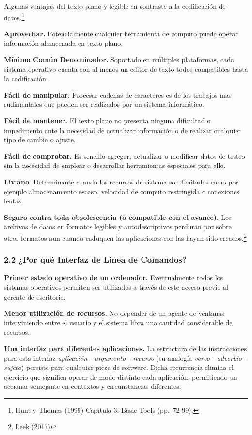\documentclass[]{article}
\begin{document}
\bigskip

Algunas ventajas del texto plano y legible en contraste a la
codificación de datos.\footnote{Hunt y Thomas (1999) Capítulo 3: Basic
  Tools (pp.~72-99).}

\textbf{Aprovechar.} Potencialmente cualquier herramienta de computo
puede operar información almacenada en texto plano.

\textbf{Mínimo Común Denominador.} Soportado en múltiples plataformas,
cada sistema operativo cuenta con al menos un editor de texto todos
compatibles hasta la codificación.

\textbf{Fácil de manipular.} Procesar cadenas de caracteres es de los
trabajos mas rudimentales que pueden ser realizados por un sistema
informático.

\textbf{Fácil de mantener.} El texto plano no presenta ninguna
dificultad o impedimento ante la necesidad de actualizar información o
de realizar cualquier tipo de cambio o ajuste.

\textbf{Fácil de comprobar.} Es sencillo agregar, actualizar o modificar
datos de testeo sin la necesidad de emplear o desarrollar herramientas
especiales para ello.

\textbf{Liviano.} Determinante cuando los recursos de sistema son
limitados como por ejemplo almacenamiento escaso, velocidad de computo
restringida o conexiones lentas.

\textbf{Seguro contra toda obsolescencia (o compatible con el avance).}
Los archivos de datos en formatos legibles y autodescriptivos perduran
por sobre otros formatos aun cuando caduquen las aplicaciones con las
hayan sido creados.\footnote{Leek (2017)}

\hypertarget{por-quuxe9-interfaz-de-linea-de-comandos}{%
\subsubsection{2.2 ¿Por qué Interfaz de Linea de
Comandos?}\label{por-quuxe9-interfaz-de-linea-de-comandos}}

\textbf{Primer estado operativo de un ordenador.} Eventualmente todos
los sistemas operativos permiten ser utilizados a través de este acceso
previo al gerente de escritorio.

\textbf{Menor utilización de recursos.} No depender de un agente de
ventanas interviniendo entre el usuario y el sistema libra una cantidad
considerable de recursos.

\textbf{Una interfaz para diferentes aplicaciones.} La estructura de las
instrucciones para esta interfaz \emph{aplicación - argumento - recurso}
(su analogía \emph{verbo - adverbio - sujeto}) persiste para cualquier
pieza de software. Dicha recurrencía elimina el ejercicio que significa
operar de modo distinto cada aplicación, permitiendo un accionar
semejante en contextos y circunstancias diferentes.
\end{document}
